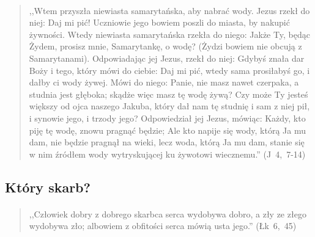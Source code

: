 \documentclass[10pt,a4paper,oneside]{article}
\begin{document}
\paragraph{}
\begin{quote}
,,Wtem przyszła niewiasta samarytańska, aby nabrać wody. Jezus rzekł do niej: Daj mi pić! Uczniowie jego bowiem poszli do miasta, by nakupić żywności. Wtedy niewiasta samarytańska rzekła do niego: Jakże Ty, będąc Żydem, prosisz mnie, Samarytankę, o wodę? (Żydzi bowiem nie obcują z Samarytanami). Odpowiadając jej Jezus, rzekł do niej: Gdybyś znała dar Boży i tego, który mówi do ciebie: Daj mi pić, wtedy sama prosiłabyś go, i dałby ci wody żywej. Mówi do niego: Panie, nie masz nawet czerpaka, a studnia jest głęboka; skądże więc masz tę wodę żywą? Czy może Ty jesteś większy od ojca naszego Jakuba, który dał nam tę studnię i sam z niej pił, i synowie jego, i trzody jego? Odpowiedział jej Jezus, mówiąc: Każdy, kto piję tę wodę, znowu pragnąć będzie; Ale kto napije się wody, którą Ja mu dam, nie będzie pragnął na wieki, lecz woda, którą Ja mu dam, stanie się w nim źródłem wody wytryskującej ku żywotowi wiecznemu.'' \mbox{(J 4, 7-14)}
\end{quote}
\subsection{Który skarb?}
\paragraph{}
\begin{quote}
,,Człowiek dobry z dobrego skarbca serca wydobywa dobro, a zły ze złego wydobywa zło; albowiem z obfitości serca mówią usta jego.'' \mbox{(Łk 6, 45)}
\end{quote}
\end{document}
